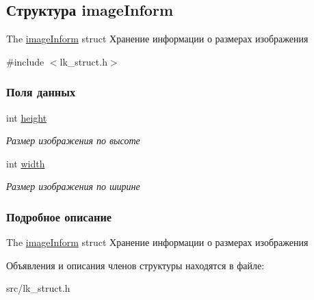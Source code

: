 \hypertarget{structimageInform}{}\subsection{Структура image\+Inform}
\label{structimageInform}


The \hyperlink{structimageInform}{image\+Inform} struct Хранение информации о размерах изображения  




{\ttfamily \#include $<$lk\+\_\+struct.\+h$>$}

\subsubsection*{Поля данных}
\begin{DoxyCompactItemize}
\item 
\hypertarget{structimageInform_ad61ef9b4de5a6d21279c3d43194d3dfd}{}int \hyperlink{structimageInform_ad61ef9b4de5a6d21279c3d43194d3dfd}{height}\label{structimageInform_ad61ef9b4de5a6d21279c3d43194d3dfd}

\begin{DoxyCompactList}\small\item\em Размер изображения по высоте \end{DoxyCompactList}\item 
\hypertarget{structimageInform_a86becec8eba0800f64a14ccc7cbab004}{}int \hyperlink{structimageInform_a86becec8eba0800f64a14ccc7cbab004}{width}\label{structimageInform_a86becec8eba0800f64a14ccc7cbab004}

\begin{DoxyCompactList}\small\item\em Размер изображения по ширине \end{DoxyCompactList}\end{DoxyCompactItemize}


\subsubsection{Подробное описание}
The \hyperlink{structimageInform}{image\+Inform} struct Хранение информации о размерах изображения 

Объявления и описания членов структуры находятся в файле\+:\begin{DoxyCompactItemize}
\item 
src/lk\+\_\+struct.\+h\end{DoxyCompactItemize}
